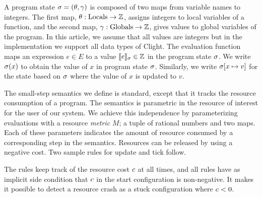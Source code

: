 \documentclass[nocopyrightspace,preprint,pldi]{sigplanconf-pldi15}
\newcommand{\iffull}[2]{\ifx\fullversion\undefined{#2}\else{#1}\fi}
\begin{document}
A program state $\sigma = (\theta, \gamma)$ is composed of two maps
from variable names to integers. The first map, $\theta : \text{Locals}
\to \mathbb{Z}$, assigns integers to local variables of a function, and the
second map, $\gamma : \text{Globals} \to \mathbb{Z}$, gives values to global
variables of the program.  In this article, we assume that all values are
integers but in the implementation we support all data types of Clight.
The evaluation function \evalE{\cdot}{} maps an expression $e \in E$
to a value $\llbracket e \rrbracket_{\sigma} \in \mathbb{Z}$ in the program state $\sigma$.
We write $\sigma(x)$ to obtain the value of $x$ in program state
$\sigma$.
Similarly, we write $\sigma[x \mapsto v]$ for the state based on $\sigma$
where the value of $x$ is updated to $v$.

The small-step semantics we define is standard, except that it tracks
the resource consumption of a program.  The semantics is parametric in
the resource of interest for the user of our system.  We achieve this
independence by parameterizing evaluations with a resource \emph{metric}
$M$; a tuple of rational numbers and two maps.  Each of these
parameters indicates the amount of resource consumed by a corresponding
step in the semantics.  Resources can be released by using a negative
cost. %
Two sample rules for update and tick follow.
The rules keep track of the resource cost $c$ at all times, and
all rules have as implicit side condition that $c$ in the start
configuration is non-negative.  It makes it possible
to detect a resource crash as a stuck configuration where $c<0$.
\end{document}
